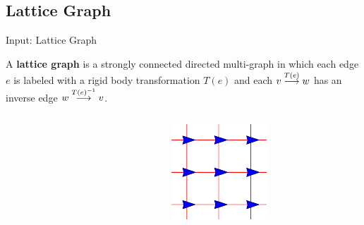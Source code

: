 \documentclass[10pt]{beamer}
\begin{document}
\subsection[Lattice Graph]{Lattice Graph}
\begin{frame}{Input: Lattice Graph}
  \begin{definition}
    A \textbf{lattice graph} is a strongly connected directed
      multi-graph in which each edge $e$ is labeled with a rigid body
      transformation $T(e)$ and each ${v}\overset{T(e)}{\longrightarrow}{w}$ has an
      inverse edge ${w}\overset{T(e)^{-1}}{\longrightarrow}{v}$.  
    \end{definition}
    \begin{columns}[T] %
      \begin{column}{.45\textwidth}
        \begin{figure}
          \centering
        \end{figure}
      \end{column}%
      \begin{column}{.45\textwidth}
        \begin{figure}
          \centering
          \includegraphics[scale=1]{figs/squarelattice}
        \end{figure}
      \end{column}%
    \end{columns}
\end{frame}
\end{document}
